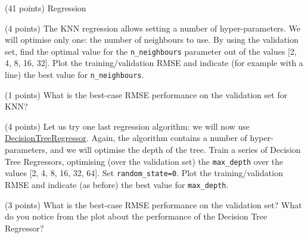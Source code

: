 \documentclass[12pt]{article}
\begin{document}
\begin{question}{\label{Q_LR_BA}(41 points) Regression}
\begin{subquestion}



\end{subquestion}

\begin{subquestion}{(4 points) The KNN regression allows setting a number of hyper-parameters. We will optimise only one: the number of neighbours to use. By using the validation set, find the optimal value for the \texttt{n\_neighbours} parameter out of the values [2, 4, 8, 16, 32]. Plot the training/validation RMSE and indicate (for example with a line) the best value for \texttt{n\_neighbours}.}






\end{subquestion}

\begin{subquestion}{(1 points) What is the best-case RMSE performance on the validation set for KNN?}






\end{subquestion}

\begin{subquestion}{(4 points) Let us try one last regression algorithm: we will now use \href{https://scikit-learn.org/stable/modules/generated/sklearn.tree.DecisionTreeRegressor.html}{DecisionTreeRegressor}. Again, the algorithm contains a number of hyper-parameters, and we will optimise the depth of the tree. Train a series of Decision Tree Regressors, optimising (over the validation set) the \texttt{max\_depth} over the values [2, 4, 8, 16, 32, 64]. Set \texttt{random\_state=0}. Plot the training/validation RMSE and indicate (as before) the best value for \texttt{max\_depth}.}






\end{subquestion}

\begin{subquestion}{(3 points) What is the best-case RMSE performance on the validation set? What do you notice from the plot about the performance of the Decision Tree Regressor?}




\end{subquestion}
\end{question}
\end{document}
